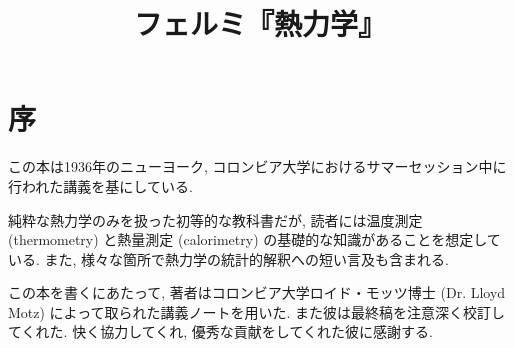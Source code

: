 \documentclass[10pt, a4paper, openany]{book}
\title{フェルミ『熱力学』}
\begin{document}
\maketitle
\frontmatter
\chapter{序}
この本は1936年のニューヨーク, コロンビア大学におけるサマーセッション中に行われた講義を基にしている.\par
純粋な熱力学のみを扱った初等的な教科書だが, 読者には温度測定 (thermometry) と熱量測定 (calorimetry) の基礎的な知識があることを想定している. また, 様々な箇所で熱力学の統計的解釈への短い言及も含まれる. \par
この本を書くにあたって, 著者はコロンビア大学ロイド・モッツ博士 (Dr. Lloyd Motz) によって取られた講義ノートを用いた. また彼は最終稿を注意深く校訂してくれた. 快く協力してくれ, 優秀な貢献をしてくれた彼に感謝する. 
%

\tableofcontents
\mainmatter

%
%
%
%
%
%
%
\end{document}
